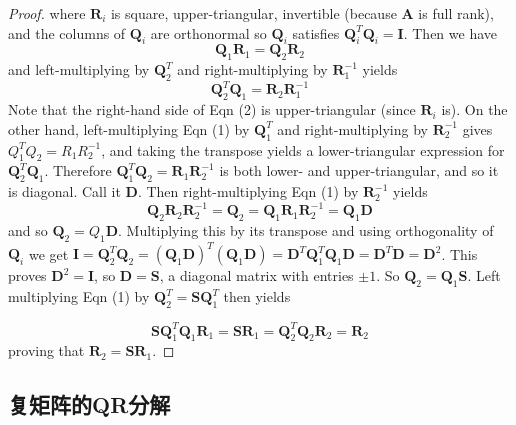 \begin{proof}
where $\boldsymbol{R}_{i}$ is square, upper-triangular, invertible (because $\boldsymbol{A}$ is full rank), and the columns of $\boldsymbol{Q}_{i}$ are orthonormal so $\boldsymbol{Q}_{i}$ satisfies $\boldsymbol{Q}_{i}^{T} \boldsymbol{Q}_{i}=\boldsymbol{I}$.
Then we have
$$
\boldsymbol{Q}_{1} \boldsymbol{R}_{1}=\boldsymbol{Q}_{2} \boldsymbol{R}_{2}
$$
and left-multiplying by $\boldsymbol{Q}_{2}^{T}$ and right-multiplying by $\boldsymbol{R}_{1}^{-1}$ yields
$$
\boldsymbol{Q}_{2}^{T} \boldsymbol{Q}_{1}=\boldsymbol{R}_{2} \boldsymbol{R}_{1}^{-1}
$$
Note that the right-hand side of Eqn (2) is upper-triangular (since $\boldsymbol{R}_{i}$ is). On the other hand, left-multiplying Eqn (1) by $\boldsymbol{Q}_{1}^{T}$ and right-multiplying by $\boldsymbol{R}_{2}^{-1}$ gives $Q_{1}^{T} Q_{2}=R_{1} R_{2}^{-1}$, and taking the transpose yields a lower-triangular expression for $\boldsymbol{Q}_{2}^{T} \boldsymbol{Q}_{1}$. Therefore $\boldsymbol{Q}_{1}^{T} \boldsymbol{Q}_{2}=\boldsymbol{R}_{1} \boldsymbol{R}_{2}^{-1}$ is both lower- and upper-triangular, and so it is diagonal. Call it $\boldsymbol{D}$. Then right-multiplying Eqn (1) by $\boldsymbol{R}_{2}^{-1}$ yields
$$
\boldsymbol{Q}_{2} \boldsymbol{R}_{2} \boldsymbol{R}_{2}^{-1}=\boldsymbol{Q}_{2}=\boldsymbol{Q}_{1} \boldsymbol{R}_{1} \boldsymbol{R}_{2}^{-1}=\boldsymbol{Q}_{1} \boldsymbol{D}
$$
and so $\boldsymbol{Q}_{2}=Q_{1} \boldsymbol{D}$. Multiplying this by its transpose and using orthogonality of $\boldsymbol{Q}_{i}$ we get $\boldsymbol{I}=\boldsymbol{Q}_{2}^{T} \boldsymbol{Q}_{2}=\left(\boldsymbol{Q}_{1} \boldsymbol{D}\right)^{T}\left(\boldsymbol{Q}_{1} \boldsymbol{D}\right)=\boldsymbol{D}^{T} \boldsymbol{Q}_{1}^{T} \boldsymbol{Q}_{1} \boldsymbol{D}=\boldsymbol{D}^{T} \boldsymbol{D}=\boldsymbol{D}^{2}$. This proves $\boldsymbol{D}^{2}=\boldsymbol{I}$, so $\boldsymbol{D}=\boldsymbol{S}$, a diagonal matrix with entries $\pm 1$. So $\boldsymbol{Q}_{2}=\boldsymbol{Q}_{1} \boldsymbol{S}$. Left multiplying Eqn (1) by $\boldsymbol{Q}_{2}^{T}=\boldsymbol{S Q}_{1}^{T}$ then yields

$$
\boldsymbol{S} \boldsymbol{Q}   _{1}^{T} \boldsymbol{Q}_{1} \boldsymbol{R}_{1}=\boldsymbol{S R}_{1}=\boldsymbol{Q}_{2}^{T} \boldsymbol{Q}_{2} \boldsymbol{R}_{2}=\boldsymbol{R}_{2}
$$
proving that $\boldsymbol{R}_{2}=\boldsymbol{S R}_{1}$.

\end{proof}

\subsection{复矩阵的QR分解}

